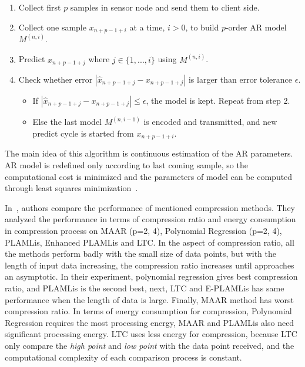 \begin{enumerate}
    \item Collect first $p$ samples in sensor node and send them to client side.
    \item Collect one sample $x_{n+p-1+i}$ at a time, $i > 0$, to build
    $p$-order
    AR model $M^{(n, i)}$.
    \item Predict $x_{n+p-1+j}$ where $j \in \{1, ..., i\}$ using $M^{(n, i)}$.
    \item Check whether error $ |\hat{x}_{n+p-1+j} - x_{n+p-1+j}|$ is larger
    than error tolerance $\epsilon$.
        \begin{itemize}
            \item If $|\hat{x}_{n+p-1+j} - x_{n+p-1+j}| \leqslant \epsilon$, the
            model is kept. Repeat from step 2.
            \item Else the last model $M^{(n, i-1)}$ is encoded and transmitted,
            and new predict cycle is started from $x_{n+p-1+i}$.
        \end{itemize} 
\end{enumerate}
The main idea of this algorithm is continuous estimation of the AR parameters.
AR model is redefined only according to last coming sample, so the computational
cost is minimized and the parameters of model can be computed through least
squares minimization~\cite{zordan2012compress}. 

In~\cite{zordan2014performance}, authors compare the performance of mentioned
compression methods. They analyzed the performance in terms of compression ratio
and energy consumption in compression process on MAAR (p={2, 4}), Polynomial
Regression (p={2, 4}), PLAMLis, Enhanced PLAMLis and LTC. In the aspect of
compression ratio, all the methods perform badly with the small size of data
points, but with the length of input data increasing, the compression ratio
increases until approaches an asymptotic. In their experiment, polynomial
regression gives best compression ratio, and PLAMLis is the second best, next,
LTC and E-PLAMLis has same performance when the length of data is large.
Finally, MAAR method has worst compression ratio. In terms of energy consumption
for compression, Polynomial Regression requires the most processing energy, MAAR
and PLAMLis also need significant processing energy. LTC uses less energy for
compression, because LTC only compare the \emph{high point} and \emph{low point}
with the data point received, and the computational complexity of each
comparison process is constant.
